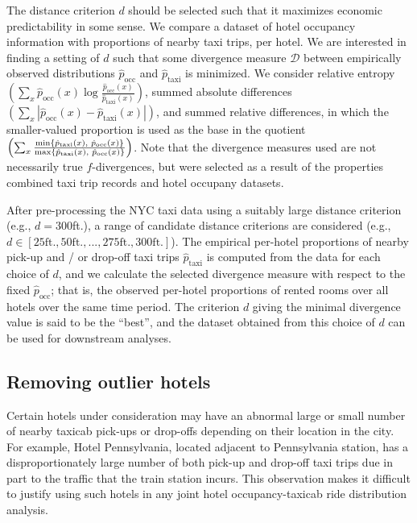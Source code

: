 \documentclass[useAMS, referee, usenatbib]{biom}
\begin{document}
The distance criterion $d$ should be selected such that it maximizes economic predictability in some sense. We compare a dataset of hotel occupancy information with proportions of nearby taxi trips, per hotel. We are interested in finding a setting of $d$ such that some divergence measure $\mathcal{D}$ between empirically observed distributions $\hat{p}_{\mathrm{occ}}$ and $\hat{p}_{\mathrm{taxi}}$ is minimized. We consider relative entropy $\left( \sum_x \hat{p}_{\mathrm{occ}} (x) \log \frac{\hat{p}_{\mathrm{occ}} (x)}{\hat{p}_{\mathrm{taxi}} (x)} \right)$, summed absolute differences $\left( \sum_x | \hat{p}_{\mathrm{occ}} (x) - \hat{p}_{\mathrm{taxi}} (x) | \right)$, and summed relative differences, in which the smaller-valued proportion is used as the base in the quotient $\left( \sum_x \frac{\min \{ \hat{p}_{\mathrm{taxi}} (x), \hspace*{0.1cm} \hat{p}_{\mathrm{occ}} (x) \}}{\max \{ \hat{p}_{\mathrm{taxi}} (x), \hspace*{0.1cm} \hat{p}_{\mathrm{occ}} (x) \}} \right)$. Note that the divergence measures used are not necessarily true $f$-divergences, but were selected as a result of the properties combined taxi trip records and hotel occupany datasets. 

After pre-processing the NYC taxi data using a suitably large distance criterion (e.g., $d = 300$ft.), a range of candidate distance criterions are considered (e.g., $d \in [25 \mathrm{ft.}, 50 \mathrm{ft.}, ..., 275 \mathrm{ft.}, 300 \mathrm{ft.}]$). The empirical per-hotel proportions of nearby pick-up and / or drop-off taxi trips $\hat{p}_{\mathrm{taxi}}$ is computed from the data for each choice of $d$, and we calculate the selected divergence measure with respect to the fixed $\hat{p}_{\mathrm{occ}}$; that is, the observed per-hotel proportions of rented rooms over all hotels over the same time period. The criterion $d$ giving the minimal divergence value is said to be the ``best'', and the dataset obtained from this choice of $d$ can be used for downstream analyses.

\subsection{Removing outlier hotels}

Certain hotels under consideration may have an abnormal large or small number of nearby taxicab pick-ups or drop-offs depending on their location in the city. For example, Hotel Pennsylvania, located adjacent to Pennsylvania station, has a disproportionately large number of both pick-up and drop-off taxi trips due in part to the traffic that the train station incurs. This observation makes it difficult to justify using such hotels in any joint hotel occupancy-taxicab ride distribution analysis.
\end{document}
